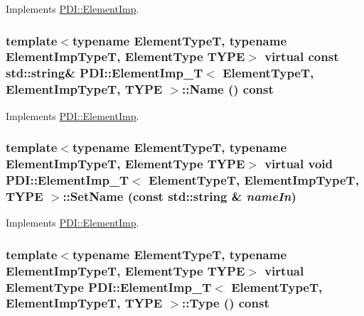 Implements \hyperlink{class_p_d_i_1_1_element_imp_fc1ab711c21225f3448c2a7c6a977b25}{PDI::ElementImp}.\hypertarget{class_p_d_i_1_1_element_imp___t_b1d86a7e12685823023fa2dc11d36f02}{
\subsubsection[{Name}]{\setlength{\rightskip}{0pt plus 5cm}template$<$typename ElementTypeT, typename ElementImpTypeT, ElementType TYPE$>$ virtual const std::string\& {\bf PDI::ElementImp\_\-T}$<$ ElementTypeT, ElementImpTypeT, TYPE $>$::Name () const}}
\label{class_p_d_i_1_1_element_imp___t_b1d86a7e12685823023fa2dc11d36f02}




Implements \hyperlink{class_p_d_i_1_1_element_imp_da2e8eb39d66e053c0d29318959aa661}{PDI::ElementImp}.\hypertarget{class_p_d_i_1_1_element_imp___t_6faa00112b7690d462881ba5863c214f}{
\subsubsection[{SetName}]{\setlength{\rightskip}{0pt plus 5cm}template$<$typename ElementTypeT, typename ElementImpTypeT, ElementType TYPE$>$ virtual void {\bf PDI::ElementImp\_\-T}$<$ ElementTypeT, ElementImpTypeT, TYPE $>$::SetName (const std::string \& {\em nameIn})}}
\label{class_p_d_i_1_1_element_imp___t_6faa00112b7690d462881ba5863c214f}




Implements \hyperlink{class_p_d_i_1_1_element_imp_deb17b530a00980a60e8e79753b19eed}{PDI::ElementImp}.\hypertarget{class_p_d_i_1_1_element_imp___t_23d3df9b834aecb1fa3afba5ebd4ae66}{
\subsubsection[{Type}]{\setlength{\rightskip}{0pt plus 5cm}template$<$typename ElementTypeT, typename ElementImpTypeT, ElementType TYPE$>$ virtual {\bf ElementType} {\bf PDI::ElementImp\_\-T}$<$ ElementTypeT, ElementImpTypeT, TYPE $>$::Type () const}}
\label{class_p_d_i_1_1_element_imp___t_23d3df9b834aecb1fa3afba5ebd4ae66}




